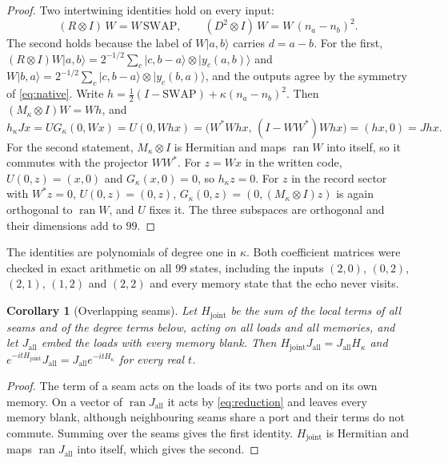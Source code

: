 \documentclass[11pt]{article}
\newtheorem{corollary}[theorem]{Corollary}
\theoremstyle{definition}
\theoremstyle{remark}
\theoremstyle{plain}
\newcommand{\ket}[1]{\lvert #1\rangle}
\newcommand{\ran}{\operatorname{ran}}
\newcommand{\SWAP}{\mathrm{SWAP}}
\begin{document}
\begin{proof}
Two intertwining identities hold on every input:
\begin{equation}
(R\otimes I)\,W=W\,\SWAP,\qquad (D^{2}\otimes I)\,W=W\,(n_a-n_b)^{2}.
\label{eq:intertwine}
\end{equation}
The second holds because the label of $W\ket{a,b}$ carries $d=a-b$. For the
first, $(R\otimes I)W\ket{a,b}=2^{-1/2}\sum_c\ket{c,b-a}\otimes\ket{y_c(a,b)}$
and $W\ket{b,a}=2^{-1/2}\sum_c\ket{c,b-a}\otimes\ket{y_c(b,a)}$, and the
outputs agree by the symmetry of \eqref{eq:native}. Write
$h=\tfrac12(I-\SWAP)+\kappa(n_a-n_b)^{2}$. Then
$(M_\kappa\otimes I)W=Wh$, and
\[
h_\kappa Jx=U G_\kappa(0,Wx)=U(0,Whx)=\bigl(W^{*}Whx,\,(I-WW^{*})Whx\bigr)=(hx,0)=Jhx .
\]
For the second statement, $M_\kappa\otimes I$ is Hermitian and maps
$\ran W$ into itself, so it commutes with the projector $WW^{*}$. For
$z=Wx$ in the written code, $U(0,z)=(x,0)$ and $G_\kappa(x,0)=0$, so
$h_\kappa z=0$. For $z$ in the record sector with $W^{*}z=0$,
$U(0,z)=(0,z)$, $G_\kappa(0,z)=(0,(M_\kappa\otimes I)z)$ is again orthogonal
to $\ran W$, and $U$ fixes it. The three subspaces are orthogonal and their
dimensions add to $99$.
\end{proof}

The identities are polynomials of degree one in $\kappa$. Both coefficient
matrices were checked in exact arithmetic on all $99$ states, including the
inputs $(2,0)$, $(0,2)$, $(2,1)$, $(1,2)$ and $(2,2)$ and every memory state
that the echo never visits.

\begin{corollary}[Overlapping seams]
\label{cor:network}
Let $H_{\mathrm{joint}}$ be the sum of the local terms of all seams and of
the degree terms below, acting on all loads and all memories, and let
$J_{\mathrm{all}}$ embed the loads with every memory blank. Then
$H_{\mathrm{joint}}J_{\mathrm{all}}=J_{\mathrm{all}}H_\kappa$ and
$e^{-itH_{\mathrm{joint}}}J_{\mathrm{all}}=J_{\mathrm{all}}e^{-itH_\kappa}$
for every real $t$.
\end{corollary}

\begin{proof}
The term of a seam acts on the loads of its two ports and on its own
memory. On a vector of $\ran J_{\mathrm{all}}$ it acts by
\eqref{eq:reduction} and leaves every memory blank, although neighbouring
seams share a port and their terms do not commute. Summing over the seams
gives the first identity. $H_{\mathrm{joint}}$ is Hermitian and maps
$\ran J_{\mathrm{all}}$ into itself, which gives the second.
\end{proof}
\end{document}
